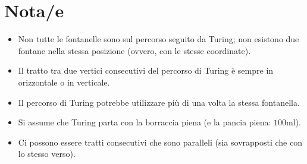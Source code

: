 \documentclass[a4paper,11pt]{article}
\begin{document}
\section*{Nota/e}
\begin{itemize}
  \item Non tutte le fontanelle sono sul percorso seguito da Turing; non
    esistono due fontane nella stessa posizione (ovvero, con le stesse
    coordinate).
  \item Il tratto tra due vertici consecutivi del percorso di Turing è
    sempre in orizzontale o in verticale.
  \item Il percorso di Turing potrebbe utilizzare più di una volta la
    stessa fontanella.
  \item Si assume che Turing parta con la borraccia piena (e la pancia
    piena: $100$ml).
  \item Ci possono essere tratti consecutivi che sono paralleli (sia
    sovrapposti che con lo stesso verso).
\end{itemize}
\end{document}
